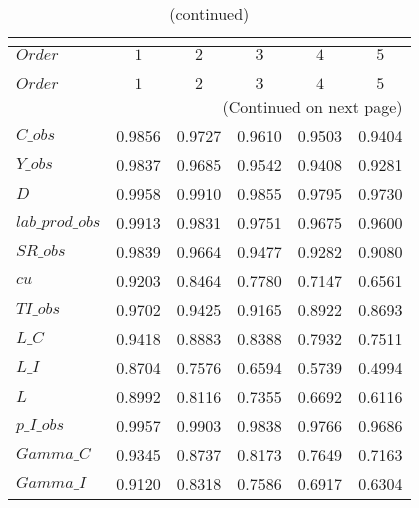  
\begin{center}
\begin{longtable}{lccccc} 
\caption{COEFFICIENTS OF AUTOCORRELATION}\\
 \label{Table:th_autocorr_matrix}\\
\toprule 
$Order           $	 & 	 $         1$	 & 	 $         2$	 & 	 $         3$	 & 	 $         4$	 & 	 $         5$\\
\midrule \endfirsthead 
\caption{(continued)}\\
 \toprule \\ 
$Order           $	 & 	 $         1$	 & 	 $         2$	 & 	 $         3$	 & 	 $         4$	 & 	 $         5$\\
\midrule \endhead 
\midrule \multicolumn{6}{r}{(Continued on next page)} \\ \bottomrule \endfoot 
\bottomrule \endlastfoot 
$C\_obs          $	 & 	    0.9856	 & 	    0.9727	 & 	    0.9610	 & 	    0.9503	 & 	    0.9404 \\ 
$Y\_obs          $	 & 	    0.9837	 & 	    0.9685	 & 	    0.9542	 & 	    0.9408	 & 	    0.9281 \\ 
$D               $	 & 	    0.9958	 & 	    0.9910	 & 	    0.9855	 & 	    0.9795	 & 	    0.9730 \\ 
$lab\_prod\_obs  $	 & 	    0.9913	 & 	    0.9831	 & 	    0.9751	 & 	    0.9675	 & 	    0.9600 \\ 
$SR\_obs         $	 & 	    0.9839	 & 	    0.9664	 & 	    0.9477	 & 	    0.9282	 & 	    0.9080 \\ 
$cu              $	 & 	    0.9203	 & 	    0.8464	 & 	    0.7780	 & 	    0.7147	 & 	    0.6561 \\ 
$TI\_obs         $	 & 	    0.9702	 & 	    0.9425	 & 	    0.9165	 & 	    0.8922	 & 	    0.8693 \\ 
$L\_C            $	 & 	    0.9418	 & 	    0.8883	 & 	    0.8388	 & 	    0.7932	 & 	    0.7511 \\ 
$L\_I            $	 & 	    0.8704	 & 	    0.7576	 & 	    0.6594	 & 	    0.5739	 & 	    0.4994 \\ 
$L               $	 & 	    0.8992	 & 	    0.8116	 & 	    0.7355	 & 	    0.6692	 & 	    0.6116 \\ 
$p\_I\_obs       $	 & 	    0.9957	 & 	    0.9903	 & 	    0.9838	 & 	    0.9766	 & 	    0.9686 \\ 
$Gamma\_C        $	 & 	    0.9345	 & 	    0.8737	 & 	    0.8173	 & 	    0.7649	 & 	    0.7163 \\ 
$Gamma\_I        $	 & 	    0.9120	 & 	    0.8318	 & 	    0.7586	 & 	    0.6917	 & 	    0.6304 \\ 
\end{longtable}
 \end{center}
